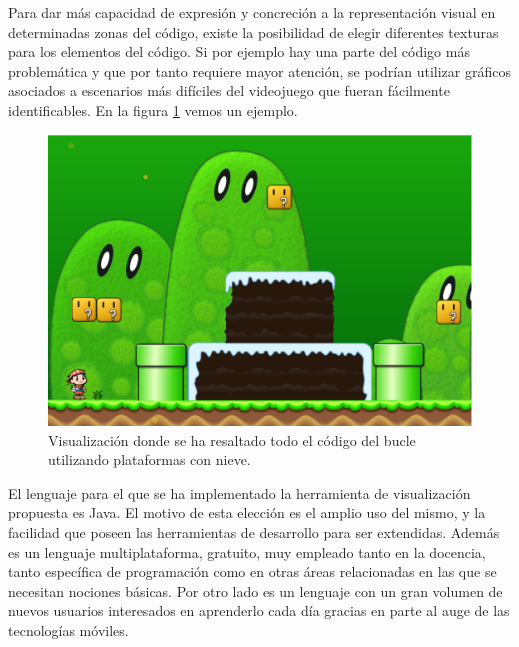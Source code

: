 \documentclass{llncs}
\begin{document}
Para dar más capacidad de expresión y concreción a la representación visual en determinadas zonas del código, existe la posibilidad de elegir diferentes texturas para los elementos del código. Si por ejemplo hay una parte del código más problemática y que por tanto requiere mayor atención, se podrían utilizar gráficos asociados a escenarios más difíciles del videojuego que fueran fácilmente identificables. En la figura \ref{fig:texture} vemos un ejemplo.

\begin{figure}[ht]
\begin{center}
\includegraphics[scale=0.15]{images/texture.eps}
\caption{Visualización donde se ha resaltado todo el código del bucle utilizando plataformas con nieve.
\label{fig:texture}}
\end{center}
\end{figure}

El lenguaje para el que se ha implementado la herramienta de visualización propuesta es Java. El motivo de esta elección es el amplio uso del mismo, y la facilidad que poseen las herramientas de desarrollo para ser extendidas. Además es un lenguaje multiplataforma, gratuito, muy empleado tanto en la docencia, tanto específica de programación como en otras áreas relacionadas en las que se necesitan nociones básicas. Por otro lado es un lenguaje con un gran volumen de nuevos usuarios interesados en aprenderlo cada día gracias en parte al auge de las tecnologías móviles.


\end{document}

